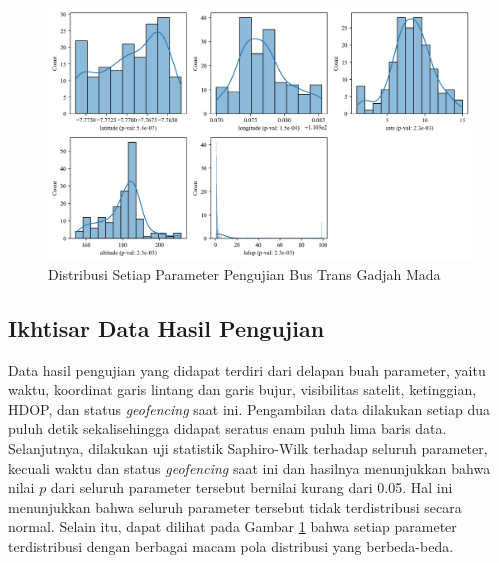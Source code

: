 \begin{figure}[H]
	\centering
	\begin{adjustbox}{width=\textwidth}
		\includegraphics{contents/chapter-4/pengujian-bergerak/distribusi.png}
	\end{adjustbox}
	\caption{Distribusi Setiap Parameter Pengujian Bus Trans Gadjah Mada}
	\label{Fig: moving-distribusi}
\end{figure}

\subsection{Ikhtisar Data Hasil Pengujian}
Data hasil pengujian yang didapat terdiri dari delapan buah parameter, yaitu waktu, koordinat garis lintang dan garis bujur, visibilitas satelit, ketinggian, HDOP, dan status \textit{geofencing} saat ini. Pengambilan data dilakukan setiap dua puluh detik sekalisehingga didapat seratus enam puluh lima baris data. Selanjutnya, dilakukan uji statistik Saphiro-Wilk terhadap seluruh parameter, kecuali waktu dan status \textit{geofencing} saat ini dan hasilnya menunjukkan bahwa nilai $p$ dari seluruh parameter tersebut bernilai kurang dari 0.05. Hal ini menunjukkan bahwa seluruh parameter tersebut tidak terdistribusi secara normal. Selain itu, dapat dilihat pada Gambar \ref{Fig: moving-distribusi} bahwa setiap parameter terdistribusi dengan berbagai macam pola distribusi yang berbeda-beda.

